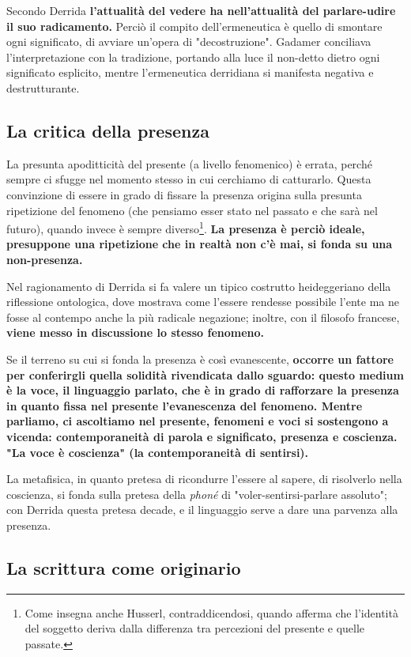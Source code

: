 Secondo Derrida \textbf{l'attualità del vedere ha nell'attualità del parlare-udire il suo radicamento.}
Perciò il compito dell'ermeneutica è quello di
smontare ogni significato, di avviare un'opera di
"decostruzione". Gadamer conciliava l'interpretazione con
la tradizione, portando alla luce il non-detto dietro
ogni significato esplicito, mentre l'ermeneutica
derridiana si manifesta negativa e destrutturante.

\subsection{La critica della presenza}

La presunta apoditticità del presente (a livello
fenomenico) è errata, perché sempre ci sfugge
nel momento stesso in cui cerchiamo di catturarlo.
Questa convinzione di essere in grado di fissare
la presenza origina sulla presunta ripetizione
del fenomeno (che pensiamo esser stato nel passato e che
sarà nel futuro), quando invece è sempre
diverso\footnote{Come insegna anche Husserl, contraddicendosi, quando afferma che l'identità del soggetto deriva
	dalla differenza tra percezioni del presente e quelle
	passate.}. \textbf{La presenza è perciò ideale, presuppone
una ripetizione che in realtà non c'è mai, si
fonda su una non-presenza.}

Nel ragionamento di Derrida si fa valere un
tipico costrutto heideggeriano della riflessione
ontologica, dove mostrava come l'essere rendesse
possibile l'ente ma ne fosse al contempo anche la
più radicale negazione; inoltre, con il filosofo francese, \textbf{viene messo in discussione lo
stesso fenomeno.}

Se il terreno su cui si fonda la presenza è così
evanescente, \textbf{occorre un fattore per conferirgli quella
solidità rivendicata dallo sguardo: questo medium
è la voce, il linguaggio parlato, che è in grado
di rafforzare la presenza in quanto fissa nel
presente l'evanescenza del fenomeno. Mentre
parliamo, ci ascoltiamo nel presente, fenomeni e
voci si sostengono a vicenda: contemporaneità di
parola e significato, presenza e coscienza. "La voce
è coscienza" (la contemporaneità di sentirsi).}

La metafisica, in quanto pretesa di ricondurre
l'essere al sapere, di risolverlo nella coscienza, si
fonda sulla pretesa della \textit{phoné} di "voler-sentirsi-parlare assoluto"; con Derrida questa pretesa decade,
e il linguaggio serve a dare una parvenza alla presenza.

\subsection{La scrittura come originario}

